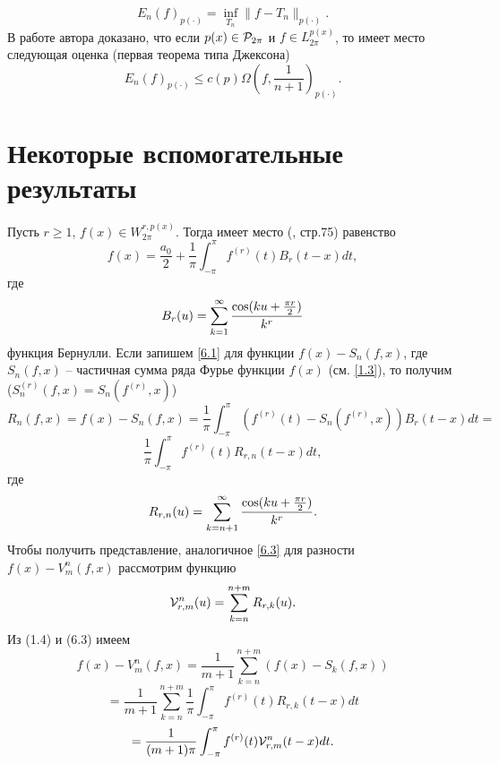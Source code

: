 \begin{equation}\label{5.8}
    E_n(f)_{p(\cdot)}=\inf_{T_n}\|f-T_n\|_{p(\cdot)}.
\end{equation}
 В работе автора \cite{Shar6} доказано, что если $p(x)\in{\cal P}_{2\pi}$ и $f\in L_{2\pi}^{p(x)} $, то имеет место следующая оценка (первая теорема типа Джексона)
\begin{equation}\label{5.9}
    E_n(f)_{p(\cdot)}\le c(p)\Omega(f,\frac{1}{n+1})_{p(\cdot)}.
\end{equation}


\section{Некоторые вспомогательные результаты}\label{s6}

Пусть $r\ge1$, $f(x)\in W_{2\pi}^{r,p(x)} $. Тогда имеет место (\cite{Zigmund}, стр.75) равенство
\begin{equation}\label{6.1}
    f(x)=\frac{a_0}{2}+ \frac{1}{\pi}\int_{-\pi}^\pi f^{(r)}(t)B_r(t-x)dt,
\end{equation}
где
\begin{equation}\label{6.2}
    B_r(u)=\sum_{k=1}^\infty {\cos(ku+\frac{\pi r}{2})\over k^r}
\end{equation}
функция Бернулли. Если запишем \eqref{6.1} для функции $f(x)-S_n(f,x)$, где $S_n(f,x)$ -- частичная сумма ряда Фурье функции $f(x)$ (см. \eqref{1.3}), то получим ($S_n^{(r)}(f,x)=S_n(f^{(r)},x)$)
$$
R_n(f,x)=f(x)-S_n(f,x)=\frac{1}{\pi}\int_{-\pi}^\pi( f^{(r)}(t)-S_n(f^{(r)},x))B_r(t-x)dt=
$$
\begin{equation}\label{6.3}
    \frac{1}{\pi}\int_{-\pi}^\pi f^{(r)}(t)R_{r,n}(t-x)dt,
\end{equation}
где
\begin{equation}\label{6.4}
     R_{r,n}(u)=\sum_{k=n+1}^\infty {\cos(ku+\frac{\pi r}{2})\over k^r}.
\end{equation}
Чтобы получить представление, аналогичное \eqref{6.3} для разности $f(x)-V_m^n(f,x)$ рассмотрим функцию
\begin{equation}\label{6.5}
    {\cal V}_{r,m}^n(u)=\sum_{k=n}^{n+m}R_{r,k}(u).
\end{equation}
Из (1.4) и (6.3) имеем
$$
f(x)-V_m^n(f,x)=\frac{1}{m+1}\sum_{k=n}^{n+m}(f(x)-S_k(f,x))
$$
$$
=\frac{1}{m+1}\sum_{k=n}^{n+m}\frac{1}{\pi}\int_{-\pi}^\pi f^{(r)}(t)R_{r,k}(t-x)dt
$$
\begin{equation}\label{6.6}
    =\frac{1}{(m+1)\pi}\int_{-\pi}^\pi f^{(r)}(t){\cal V}_{r,m}^n(t-x)dt.
\end{equation}
